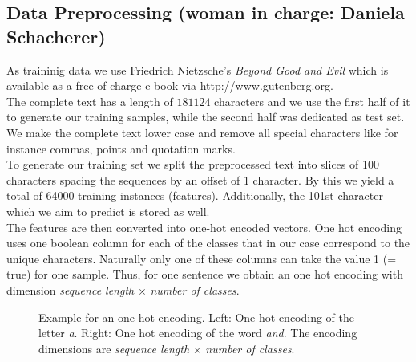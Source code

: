 \documentclass[11pt,a4paper,bibliography=totocnumbered,listof=totocnumbered]{scrartcl}
\begin{document}
\subsection{Data Preprocessing \small{(woman in charge: Daniela Schacherer)}}
As traininig data we use Friedrich Nietzsche’s \textit{Beyond Good and Evil} which is available as a free of charge e-book via http://www.gutenberg.org. \\
The complete text has a length of $181124$ characters and we use the first half of it to generate our training samples, while the second half was dedicated as test set. We make the complete text lower case and remove all special characters like for instance commas, points and quotation marks. \\
To generate our training set we split the preprocessed text into slices of 100 characters spacing the sequences by an offset of 1 character. By this we yield a total of 64000 training instances (features). Additionally, the 101st character which we aim to predict is stored as well. \\
The features are then converted into one-hot encoded vectors. One hot encoding uses one boolean column for each of the classes that in our case correspond to the unique characters. Naturally only one of these columns can take the value 1 (= true) for one sample. Thus, for one sentence we obtain an one hot encoding with dimension \textit{sequence length} $\times$ \textit{number of classes}.

	\begin{figure}[h!] 
		\label{fig:onehot}
		\caption{Example for an one hot encoding. Left: One hot encoding of the letter \textit{a}. Right: One hot encoding of the word \textit{and}. The encoding dimensions are \textit{sequence length} $\times$ \textit{number of classes}.}
	\end{figure}
\end{document}
